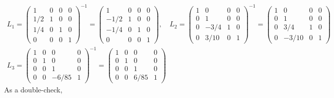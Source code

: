 \documentclass[12pt]{article}
\begin{document}
			\begin{gather*} 
			L_{1} = \begin{pmatrix}
			1 & 0 & 0 & 0 \\
			1/2 & 1 & 0 & 0 \\
			1/4 & 0 & 1 & 0 \\
			0 & 0 & 0 & 1 
			\end{pmatrix}^{-1} = \begin{pmatrix}
			1 & 0 & 0 & 0 \\
			-1/2 & 1 & 0 & 0 \\
			-1/4 & 0 & 1 & 0 \\
			0 & 0 & 0 & 1 
			\end{pmatrix}, \quad L_{2} = \begin{pmatrix}
			1 & 0 & 0 & 0 \\
			0 & 1 & 0 & 0 \\
			0 & -3/4 & 1 & 0 \\
			0 & 3/10 & 0 & 1 
			\end{pmatrix}^{-1} = \begin{pmatrix}
			1 & 0 & 0 & 0 \\
			0 & 1 & 0 & 0 \\
			0 & 3/4 & 1 & 0 \\
			0 & -3/10 & 0 & 1 
			\end{pmatrix} \\ L_{3} = \begin{pmatrix}
			1 & 0 & 0 & 0 \\
			0 & 1 & 0 & 0 \\
			0 & 0 & 1 & 0 \\
			0 & 0 & -6/85 & 1 
			\end{pmatrix}^{-1} = \begin{pmatrix}
			1 & 0 & 0 & 0 \\
			0 & 1 & 0 & 0 \\
			0 & 0 & 1 & 0 \\
			0 & 0 & 6/85 & 1 
			\end{pmatrix}
			\end{gather*}
			As a double-check, 
\end{document}
